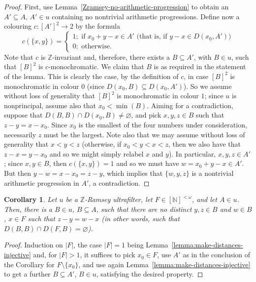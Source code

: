 \documentclass{amsart}
\newtheorem{corollary}[theorem]{Corollary}
\theoremstyle{definition}
\theoremstyle{remark}
\numberwithin{equation}{section}
\begin{document}
\begin{proof}
    First, use Lemma~\ref{Zramsey-no-arithmetic-progression} to obtain an $A'\subseteq A$, $A'\in u$ containing no nontrivial arithmetic progressions. Define now a colouring $c:[A']^2\longrightarrow 2$ by the formula
    \begin{equation*}
        c(\{x,y\})=\begin{cases}
        1;\text{ if }x_0+y-x\in A'\text{ (that is, if }y-x\in D(x_0,A')\text{)} \\
        0; \text{ otherwise.}
        \end{cases}
    \end{equation*}
    Note that $c$ is $\mathbb Z$-invariant and, therefore, there exists a $B\subseteq A'$, with $B\in u$, such that $[B]^2$ is $c$-monochromatic. We claim that $B$ is as required in the statement of the lemma. This is clearly the case, by the definition of $c$, in case $[B]^2$ is monochromatic in colour $0$ (since $D(x_0,B)\subseteq D(x_0,A')$). So we assume without loss of generality that $[B]^2$ is monochromatic in colour $1$; since $u$ is nonprincipal, assume also that $x_0<\min(B)$. Aiming for a contradiction, suppose that $D(B,B)\cap D(x_0,B)\neq\varnothing$, and pick $x,y,z\in B$ such that $z-y=x-x_0$. Since $x_0$ is the smallest of the four numbers under consideration, necessarily $z$ must be the largest. Note also that we may assume without loss of generality that $x<y<z$ (otherwise, if $x_0<y<x<z$, then we also have that $z-x=y-x_0$ and so we might simply relabel $x$ and $y$). In particular, $x,y,z\in A'$; since $x,y\in B$, then $c(\{x,y\})=1$ and so we must have $w=x_0+y-x\in A'$. But then $y-w=x-x_0=z-y$, which implies that $\{w,y,z\}$ is a nontrivial arithmetic progression in $A'$, a contradiction.
\end{proof}

\begin{corollary}\label{more-general-make-distances-injective}
Let $u$ be a $\mathbb Z$-Ramsey ultrafilter, let $F\in[\mathbb N]^{<\omega}$, and let $A\in u$. Then, there is a $B\in u$, $B\subseteq A$, such that there are no distinct $y,z\in B$ and $w\in B$, $x\in F$ such that $z-y=w-x$ (in other words, such that $D(B,B)\cap D(F,B)=\varnothing$).
\end{corollary}

\begin{proof}
    Induction on $|F|$, the case $|F|=1$ being Lemma~\ref{lemma:make-distances-injective} and, for $|F|>1$, it suffices to pick $x_0\in F$, use $A'$ as in the conclusion of the Corollary for $F\setminus\{x_0\}$, and use again Lemma~\ref{lemma:make-distances-injective} to get a further $B\subseteq A'$, $B\in u$, satisfying the desired property.
\end{proof}
\end{document}
